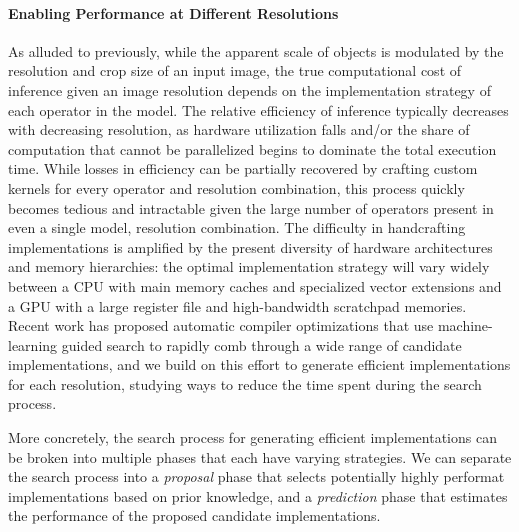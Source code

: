 \paragraph{Enabling Performance at Different Resolutions}
As alluded to previously, while the apparent scale of objects is modulated by the resolution and crop size of an input image, the true computational cost of inference given an image resolution depends on the implementation strategy of each operator in the model.
The relative efficiency of inference typically decreases with decreasing resolution, as hardware utilization falls and/or the share of computation that cannot be parallelized begins to dominate the total execution time.
While losses in efficiency can be partially recovered by crafting custom kernels for every operator and resolution combination, this process quickly becomes tedious and intractable given the large number of operators present in even a single model, resolution combination.
The difficulty in handcrafting implementations is amplified by the present diversity of hardware architectures and memory hierarchies: the optimal implementation strategy will vary widely between a CPU with main memory caches and specialized vector extensions and a GPU with a large register file and high-bandwidth scratchpad memories.
Recent work has proposed automatic compiler optimizations that use machine-learning guided search to rapidly comb through a wide range of candidate implementations, and we build on this effort to generate efficient implementations for each resolution, studying ways to reduce the time spent during the search process.

More concretely, the search process for generating efficient implementations can be broken into multiple phases that each have varying strategies.
We can separate the search process into a \emph{proposal} phase that selects potentially highly performat implementations based on prior knowledge, and a \emph{prediction} phase that estimates the performance of the proposed candidate implementations.


